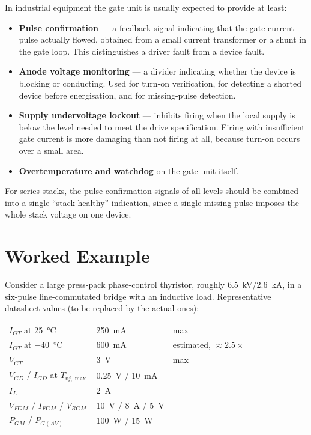 \documentclass[11pt,a4paper]{article}
\begin{document}
In industrial equipment the gate unit is usually expected to provide at least:

\begin{itemize}
  \item \textbf{Pulse confirmation} --- a feedback signal indicating that the gate
        current pulse actually flowed, obtained from a small current transformer or
        a shunt in the gate loop. This distinguishes a driver fault from a device
        fault.
  \item \textbf{Anode voltage monitoring} --- a divider indicating whether the
        device is blocking or conducting. Used for turn-on verification, for
        detecting a shorted device before energisation, and for missing-pulse
        detection.
  \item \textbf{Supply undervoltage lockout} --- inhibits firing when the local
        supply is below the level needed to meet the drive specification. Firing
        with insufficient gate current is more damaging than not firing at all,
        because turn-on occurs over a small area.
  \item \textbf{Overtemperature and watchdog} on the gate unit itself.
\end{itemize}

For series stacks, the pulse confirmation signals of all levels should be combined
into a single ``stack healthy'' indication, since a single missing pulse imposes
the whole stack voltage on one device.

\section{Worked Example}

Consider a large press-pack phase-control thyristor, roughly
\SI{6.5}{\kilo\volt}/\SI{2.6}{\kilo\ampere}, in a six-pulse line-commutated bridge
with an inductive load. Representative datasheet values (to be replaced by the
actual ones):

\begin{center}
\begin{tabular}{@{}lll@{}}
\toprule
$I_{GT}$ at \SI{25}{\celsius} & \SI{250}{\milli\ampere} & max \\
$I_{GT}$ at \SI{-40}{\celsius} & \SI{600}{\milli\ampere} & estimated, $\approx 2.5\times$ \\
$V_{GT}$ & \SI{3}{\volt} & max \\
$V_{GD}$ / $I_{GD}$ at $T_{vj,\max}$ & \SI{0.25}{\volt} / \SI{10}{\milli\ampere} & \\
$I_L$ & \SI{2}{\ampere} & \\
$V_{FGM}$ / $I_{FGM}$ / $V_{RGM}$ & \SI{10}{\volt} / \SI{8}{\ampere} / \SI{5}{\volt} & \\
$P_{GM}$ / $P_{G(AV)}$ & \SI{100}{\watt} / \SI{15}{\watt} & \\
\bottomrule
\end{tabular}
\end{center}
\end{document}
